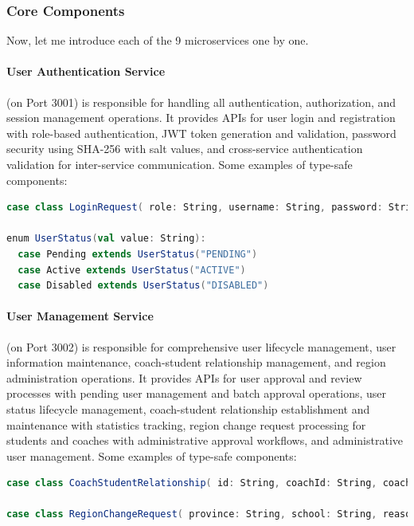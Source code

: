 \documentclass[12pt]{article}
\begin{document}
\subsubsection{Core Components}

Now, let me introduce each of the 9 microservices one by one.

\paragraph{User Authentication Service} (on Port 3001) is responsible for handling all authentication, authorization, and session management operations. It provides APIs for user login and registration with role-based authentication, JWT token generation and validation, password security using SHA-256 with salt values, and cross-service authentication validation for inter-service communication. Some examples of type-safe components:

\begin{lstlisting}[language=Scala]
case class LoginRequest( role: String, username: String, password: String )

enum UserStatus(val value: String):
  case Pending extends UserStatus("PENDING")
  case Active extends UserStatus("ACTIVE")
  case Disabled extends UserStatus("DISABLED")
\end{lstlisting}

\paragraph{User Management Service} (on Port 3002) is responsible for comprehensive user lifecycle management, user information maintenance, coach-student relationship management, and region administration operations. It provides APIs for user approval and review processes with pending user management and batch approval operations, user status lifecycle management, coach-student relationship establishment and maintenance with statistics tracking, region change request processing for students and coaches with administrative approval workflows, and administrative user management. Some examples of type-safe components:

\begin{lstlisting}[language=Scala]
case class CoachStudentRelationship( id: String, coachId: String, coachUsername: String, coachName: Option[String], studentId: String, studentUsername: String, studentName: Option[String], createdAt: LocalDateTime )

case class RegionChangeRequest( province: String, school: String, reason: String )
\end{lstlisting}
\end{document}
